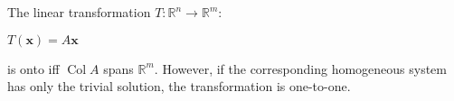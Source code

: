 \documentclass[12pt]{article}
\begin{document}
The linear transformation $T:\mathbb{R}^n\to\mathbb{R}^m$:

\begin{center}$\displaystyle T(\mathbf{x})=A\mathbf{x}$\end{center}

is onto iff $\operatorname{Col}A$ spans $\mathbb{R}^m$.  However, if the corresponding homogeneous system has only the trivial solution, the transformation is one-to-one.
\end{document}
